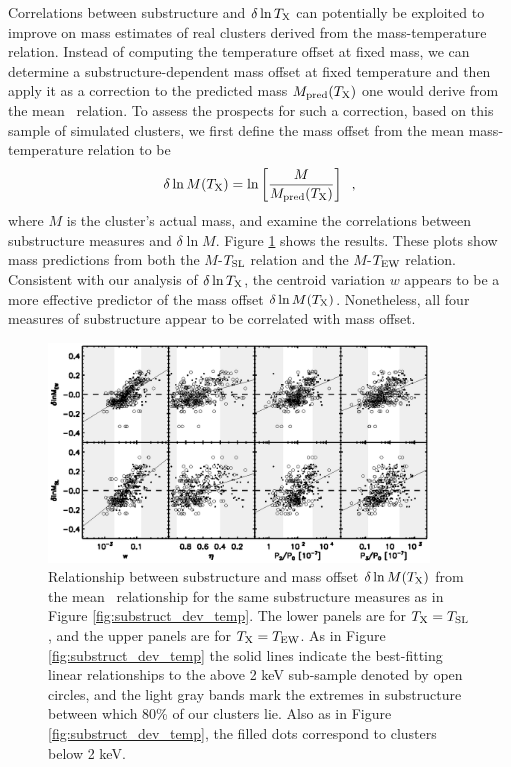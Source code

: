 \documentclass{aastex} \usepackage{natbib}
\begin{document}
Correlations between substructure and $\delta \ln T_{\rm X}$ can potentially
be exploited to improve on mass estimates of real clusters derived
from the mass-temperature relation.  Instead of computing the
temperature offset at fixed mass, we can determine a
substructure-dependent mass offset at fixed temperature and then apply
it as a correction to the predicted mass $M_{\rm pred}(T_{\rm X})$ one would
derive from the mean \mtx\ relation.  To assess the prospects for such
a correction, based on this sample of simulated clusters, we first
define the mass offset from the mean mass-temperature relation to be
\begin{equation}
  \delta \ln M (T_{\rm X}) = \ln \left[ \frac {M} {M_{\rm pred}(T_{\rm X})} \right] \; \; ,
  \label{eq:deltaM}
\end{equation}
where $M$ is the cluster's actual mass, and examine the correlations
between substructure measures and $\delta \ln M$.  Figure
\ref{fig:substruct_dev} shows the results.  These plots show mass
predictions from both the $M$-$T_{\rm SL}$ relation and the $M$-$T_{\rm EW}$
relation.  Consistent with our analysis of $\delta \ln T_{\rm X}$, the
centroid variation $w$ appears to be a more effective predictor of the
mass offset $\delta \ln M (T_{\rm X})$.  Nonetheless, all four measures of
substructure appear to be correlated with mass offset.

\begin{figure}[b]
  \centering
  \includegraphics[width=0.9\textwidth]{f7.eps}
  \caption{Relationship between substructure and mass offset $\delta
    \ln M (T_{\rm X})$ from the mean \mtx\ relationship for the same
    substructure measures as in Figure \ref{fig:substruct_dev_temp}.
    The lower panels are for $T_{\rm X} = T_{\rm SL}$, and the upper panels are
    for $T_{\rm X} = T_{\rm EW}$.  As in Figure \ref{fig:substruct_dev_temp} the
    solid lines indicate the best-fitting linear relationships to the
    above 2 keV sub-sample denoted by open circles, and the light gray
    bands mark the extremes in substructure between which 80\% of our
    clusters lie.  Also as in Figure \ref{fig:substruct_dev_temp}, the
    filled dots correspond to clusters below 2 keV.}
  \label{fig:substruct_dev}
\end{figure}
\end{document}
